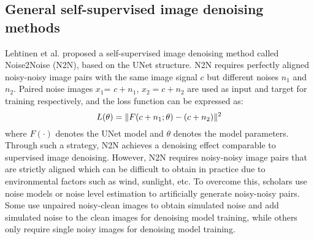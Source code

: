 \documentclass[conference]{IEEEtran}
\begin{document}
\subsection{General self-supervised image denoising methods}
\noindent Lehtinen et al. \cite{lehtinen2018noise2noise} proposed a self-supervised image denoising method called Noise2Noise (N2N)\cite{lehtinen2018noise2noise}, based on the UNet \cite{ko2018pac} structure. N2N requires perfectly aligned noisy-noisy image pairs with the same image signal $c$ but different noises $n_1$ and $n_2$. Paired noise images $x_1$= $c+n_1$, $x_2= c+n_2$ are used as input and target for training respectively, and the loss function can be expressed as:
\begin{equation}
	\setlength{\abovedisplayskip}{0pt}
	\setlength{\belowdisplayskip}{0pt}
	L(\theta) = \Vert F(c+n_1;\theta) - (c+n_2) \Vert^2
	\label{eq:N2N}
\end{equation}
where $F(\cdot)$ denotes the UNet model and $\theta$ denotes the model parameters. Through such a strategy, N2N achieves a denoising effect comparable to supervised image denoising. However, N2N requires noisy-noisy image pairs that are strictly aligned which can be difficult to obtain in practice due to environmental factors such as wind, sunlight, etc. To overcome this, scholars use noise models \cite{moran2020noisier2noise, krull2020probabilistic, xu2020noisy, kim2021noise2score, zhang2022idr, ramani2008monte} or noise level estimation \cite{chen2018image, zhang2022idr, kim2022noise} to artificially generate noisy-noisy pairs. Some use  unpaired noisy-clean images to obtain simulated noise \cite{chen2018image, wu2020unpaired, moran2020noisier2noise} and add simulated noise to the clean images for denoising model training, while others only require single noisy images for denoising model training\cite{krull2019noise2void,batson2019noise2self,laine2019high, xie2020noise2same, quan2020self2self, huang2021neighbor2neighbor, wang2022blind2unblind,lee2022ap,neshatavar2022cvf, zhang2023mm, vaksman2023patch, li2023spatially}.
\end{document}
